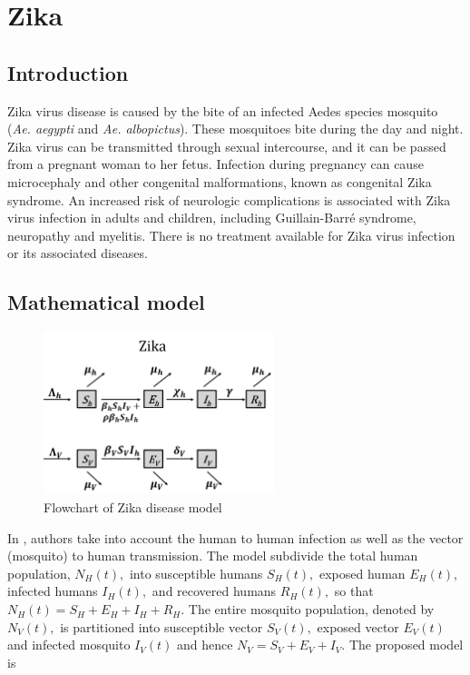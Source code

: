 \documentclass{book}
\begin{document}
\section{Zika}
\subsection*{Introduction}
 Zika virus disease is caused by the bite of an infected Aedes species mosquito (\textit{Ae. aegypti} and \textit{Ae. albopictus}). These mosquitoes bite during the day and night.
 Zika virus can be transmitted through sexual intercourse, and it can be passed from a pregnant woman to her fetus. Infection during pregnancy can cause microcephaly and other congenital malformations, known as congenital Zika syndrome. An increased risk of neurologic complications is associated with Zika virus infection in adults and children, including Guillain-Barré syndrome, neuropathy and myelitis. There is no treatment available for Zika virus infection or its associated diseases.

\subsection*{Mathematical model}

\begin{figure}
    \centering
    \includegraphics[width = 0.6\textwidth]{Flowcharts/zika.png}
    \caption{Flowchart of Zika disease model}
    \label{fig:zika_flow}
\end{figure}
In \cite{bonyah2017theoretical}, authors take into account the human to human infection as well as the vector (mosquito) to human transmission. The model subdivide the total human population, $N_{H}(t),$ into susceptible humans $S_{H}(t),$ exposed human $E_{H}(t),$ infected humans $I_{H}(t),$ and recovered humans $R_{H}(t),$ so that $N_{H}(t)=S_{H}+E_{H}+I_{H}+R_{H}$. The entire mosquito population, denoted by $N_{V}(t),$ is partitioned into susceptible vector $S_{V}(t),$ exposed vector $E_{V}(t)$ and infected mosquito $I_{V}(t)$ and hence $N_{V}=S_{V}+E_{V}+I_{V}$. The proposed model is
\end{document}
